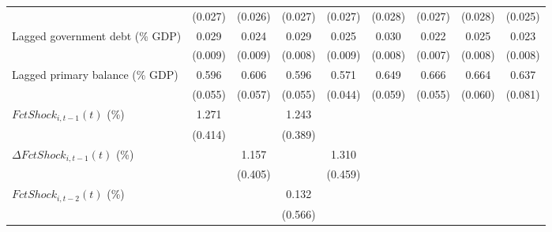 {\begin{tabular}{l*{8}{c}}
                    &     (0.027)         &     (0.026)         &     (0.027)         &     (0.027)         &     (0.028)         &     (0.027)         &     (0.028)         &     (0.025)         \\
\addlinespace
Lagged government debt (\% GDP)&       0.029\sym{***}&       0.024\sym{**} &       0.029\sym{***}&       0.025\sym{**} &       0.030\sym{***}&       0.022\sym{**} &       0.025\sym{***}&       0.023\sym{**} \\
                    &     (0.009)         &     (0.009)         &     (0.008)         &     (0.009)         &     (0.008)         &     (0.007)         &     (0.008)         &     (0.008)         \\
\addlinespace
Lagged primary balance (\% GDP)&       0.596\sym{***}&       0.606\sym{***}&       0.596\sym{***}&       0.571\sym{***}&       0.649\sym{***}&       0.666\sym{***}&       0.664\sym{***}&       0.637\sym{***}\\
                    &     (0.055)         &     (0.057)         &     (0.055)         &     (0.044)         &     (0.059)         &     (0.055)         &     (0.060)         &     (0.081)         \\
\addlinespace
$ FctShock_{i,t-1}(t)$ (\%)&       1.271\sym{**} &                     &       1.243\sym{***}&                     &                     &                     &                     &                     \\
                    &     (0.414)         &                     &     (0.389)         &                     &                     &                     &                     &                     \\
\addlinespace
$ \Delta FctShock_{i,t-1}(t)$ (\%)&                     &       1.157\sym{**} &                     &       1.310\sym{**} &                     &                     &                     &                     \\
                    &                     &     (0.405)         &                     &     (0.459)         &                     &                     &                     &                     \\
\addlinespace
$ FctShock_{i,t-2}(t)$ (\%)&                     &                     &       0.132         &                     &                     &                     &                     &                     \\
                    &                     &                     &     (0.566)         &                     &                     &                     &                     &                     \\

\end{tabular}}
